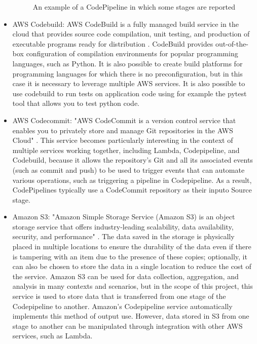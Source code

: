 \begin{itemize}
\begin{figure}[h]
        \caption{An example of a CodePipeline in which some stages are reported \cite{AWSCodepipeline}}
        \label{fig:AWSCodepipeline}
    \end{figure}
    \item AWS Codebuild: AWS CodeBuild is a fully managed build service in the cloud that provides source code compilation, unit testing, and production of executable programs ready for distribution \cite{AWSCodebuild}. CodeBuild provides out-of-the-box configuration of compilation environments for popular programming languages, such as Python. It is also possible to create build platforms for programming languages for which there is no preconfiguration, but in this case it is necessary to leverage multiple AWS services. It is also possible to use codebuild to run tests on application code using for example the pytest tool that allows you to test python code.
    \item AWS Codecommit: "AWS CodeCommit is a version control service that enables you to privately store and manage Git repositories in the AWS Cloud" \cite{AWSCodecommit}. This service becomes particularly interesting in the context of multiple services working together, including Lambda, Codepipeline, and Codebuild, because it allows the repository's Git and all its associated events (such as commit and push) to be used to trigger events that can automate various operations, such as triggering a pipeline in Codepipeline. As a result, CodePipelines typically use a CodeCommit repository as their inputo Source stage.
    \item Amazon S3: "Amazon Simple Storage Service (Amazon S3) is an object storage service that offers industry-leading scalability, data availability, security, and performance" \cite{AWSamazonS3}. The data saved in the storage is physically placed in multiple locations to ensure the durability of the data even if there is tampering with an item due to the presence of these copies; optionally, it can also be chosen to store the data in a single location to reduce the cost of the service. Amazon S3 can be used for data collection, aggregation, and analysis in many contexts and scenarios, but in the scope of this project, this service is used to store data that is transferred from one stage of the Codepipeline to another. Amazon's Codepipeline service automatically implements this method of output use. However, data stored in S3 from one stage to another can be manipulated through integration with other AWS services, such as Lambda.
    \begin{figure}[h]  %

\end{figure}
\end{itemize}
